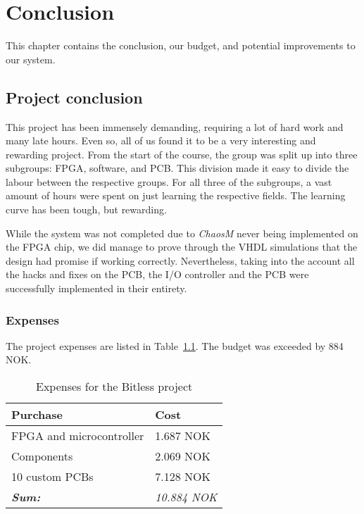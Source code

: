 
\chapter{Conclusion}

This chapter contains the conclusion, our budget, and potential improvements to our system.

\clearpage
\section{Project conclusion}

This project has been immensely demanding, requiring a lot of hard work and many
late hours. Even so, all of us found it to be a very interesting and rewarding
project. From the start of the course, the group was split up into three
subgroups: FPGA, software, and PCB. This division made it easy to divide the
labour between the respective groups. For all three of the subgroups, a vast
amount of hours were spent on just learning the respective fields. The learning
curve has been tough, but rewarding.

While the system was not completed due to \textit{ChaosM} never being
implemented on the FPGA chip, we did manage to prove through the VHDL
simulations that the design had promise if working correctly. Nevertheless,
taking into the account all the hacks and fixes on the PCB, the I/O controller
and the PCB were successfully implemented in their entirety.

\subsection{Expenses}
The project expenses are listed in Table~\ref{tab:budget}. The budget was exceeded by 884 NOK.

\begin{table}[H]
	\centering
	\begin{tabular}{|l|l|}
		\hline
		\textbf{Purchase} & \textbf{Cost} \\
		\hline
		\hline
		FPGA and microcontroller & 1.687 NOK\\
		\hline
		Components & 2.069 NOK\\
		\hline
		10 custom PCBs & 7.128 NOK \\
		\hline
		\hline
		\textbf{\textit{Sum:}} & \textit{10.884 NOK}\\
		\hline
	\end{tabular}
	\caption{Expenses for the Bitless project}
	\label{tab:budget}
\end{table}

\clearpage


